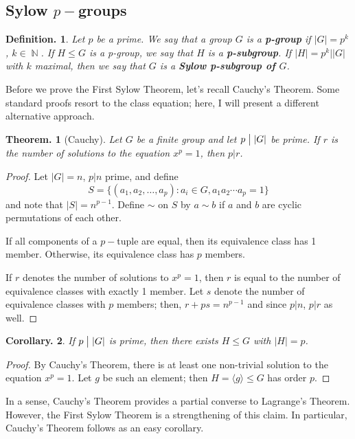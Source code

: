 \documentclass[11pt, a4paper]{memoir}
\DeclareMathOperator{\N}{{\mathbb{N}}}
\newcommand{\mbf}[1]{{\boldmath\bfseries #1}}
\renewcommand{\div}{\bigm|}
\theoremstyle{change}
\newtheorem{theorem}{Theorem.}[section]
\newtheorem{corollary}[theorem]{Corollary.}
\theoremstyle{plain}
\theoremstyle{nonumberplain}
\newtheorem{definition}{Definition.}
\newtheorem{proof}{Proof}
\numberwithin{equation}{section}
\begin{document}
\subsection{Sylow $p-$groups}
\begin{definition}
    Let $p$ be a prime.
    We say that a group $G$ is a \mbf{p-group} if $|G|=p^k$, $k\in\N$.
    If $H\leq G$ is a p-group, we say that $H$ is a \mbf{p-subgroup}.
    If $|H|=p^k||G|$ with $k$ maximal, then we say that $G$ is a \mbf{Sylow p-subgroup of $G$}.
\end{definition}
Before we prove the First Sylow Theorem, let's recall Cauchy's Theorem.
Some standard proofs resort to the class equation; here, I will present a different alternative approach.
\begin{theorem}[Cauchy]
    Let $G$ be a finite group and let $p\div|G|$ be prime.
    If $r$ is the number of solutions to the equation $x^p=1$, then $p|r$.
\end{theorem}
\begin{proof}
    Let $|G|=n$, $p|n$ prime, and define
    \begin{equation*}
        S=\{(a_1,a_2,\ldots,a_p):a_i\in G,a_1a_2\cdots a_p=1\}
    \end{equation*}
    and note that $|S|=n^{p-1}$.
    Define $\sim$ on $S$ by $a\sim b$ if $a$ and $b$ are cyclic permutations of each other.

    If all components of a $p-$tuple are equal, then its equivalence class has 1 member.
    Otherwise, its equivalence class has $p$ members.

    If $r$ denotes the number of solutions to $x^p=1$, then $r$ is equal to the number of equivalence classes with exactly 1 member.
    Let $s$ denote the number of equivalence classes with $p$ members; then, $r+ps=n^{p-1}$ and since $p|n$, $p|r$ as well.
\end{proof}
\begin{corollary}
    If $p\div |G|$ is prime, then there exists $H\leq G$ with $|H|=p$.
\end{corollary}
\begin{proof}
    By Cauchy's Theorem, there is at least one non-trivial solution to the equation $x^p=1$.
    Let $g$ be such an element; then $H=\langle g\rangle\leq G$ has order $p$.
\end{proof}
In a sense, Cauchy's Theorem provides a partial converse to Lagrange's Theorem.
However, the First Sylow Theorem is a strengthening of this claim.
In particular, Cauchy's Theorem follows as an easy corollary.
\end{document}
